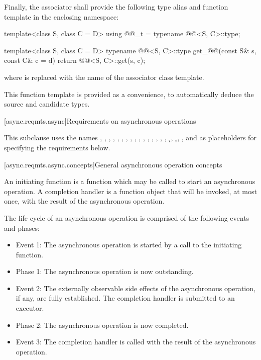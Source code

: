 \pnum
 Finally, the associator shall provide the following type alias and function template in the enclosing namespace:

\begin{codeblock}
template<class S, class C = D> using @@_t = typename @@<S, C>::type;

template<class S, class C = D>
typename @@<S, C>::type get_@@(const S& s, const C& c = d)
{
  return @@<S, C>::get(s, c);
}
\end{codeblock}

where  is replaced with the name of the associator class template.
\begin{note} This function template is provided as a convenience, to automatically deduce the source and candidate types. \end{note}



[async.reqmts.async]{Requirements on asynchronous operations}

\pnum
This subclause uses the names , , , , , , , , , , , , , , , , $_i$, $_i$, , and  as placeholders for specifying the requirements below.


[async.reqmts.async.concepts]{General asynchronous operation concepts}

\pnum
An initiating function is a function which may be called to start an asynchronous operation. A completion handler is a function object that will be invoked, at most once, with the result of the asynchronous operation.

\pnum
 The life cycle of an asynchronous operation is comprised of the following events and phases:

\begin{itemize}
\item
Event 1: The asynchronous operation is started by a call to the initiating function.

\item
Phase 1: The asynchronous operation is now outstanding.

\item
Event 2: The externally observable side effects of the asynchronous operation, if any, are fully established. The completion handler is submitted to an executor.

\item
Phase 2: The asynchronous operation is now completed.

\item
Event 3: The completion handler is called with the result of the asynchronous operation.
\end{itemize}

